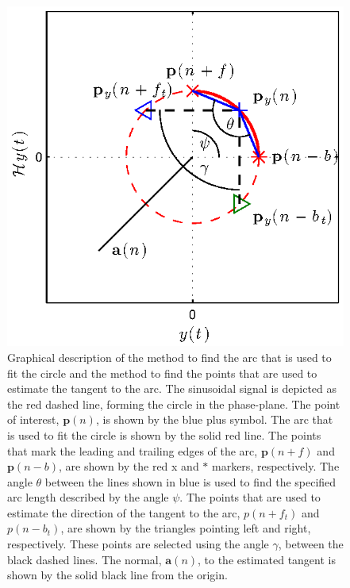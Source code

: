 \documentclass[11pt,draftcls,onecolumn]{IEEEtran}
\begin{document}
\begin{figure}[ht]
	\centering
		\includegraphics[scale=1]{./Figures/eps/SetArcLengthDemo.eps}
	\caption{Graphical description of the method to find the arc that is used to fit the circle and the method to find the points that are used to estimate the tangent to the arc. The sinusoidal signal is depicted as the red dashed line, forming the circle in the phase-plane. The point of interest, $\mathbf{p}(n)$, is shown by the blue plus symbol. The arc that is used to fit the circle is shown by the solid red line. The points that mark the leading and trailing edges of the arc, $\mathbf{p}(n+f)$ and $\mathbf{p}(n-b)$, are shown by the red x and $\ast$ markers, respectively. The angle $\theta$ between the lines shown in blue is used to find the specified arc length described by the angle $\psi$. The points that are used to estimate the direction of the tangent to the arc, $p(n+f_t)$ and $p(n-b_t)$, are shown by the triangles pointing left and right, respectively. These points are selected using the angle $\gamma$, between the black dashed lines. The normal, $\mathbf{a}(n)$, to the estimated tangent is shown by the solid black line from the origin.}
	\label{fig:SetArcLengthDemo}
\end{figure}
\end{document}
